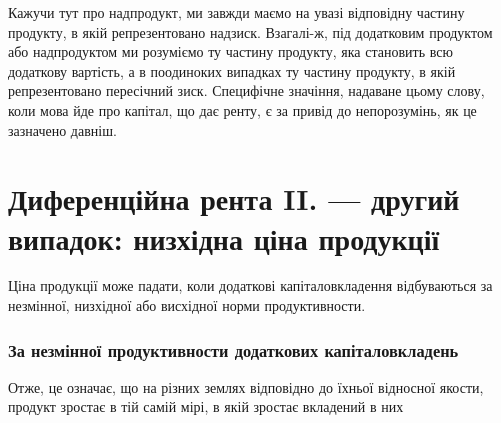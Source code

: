 Кажучи тут про надпродукт, ми завжди маємо на увазі відповідну
частину продукту, в якій репрезентовано надзиск. Взагалі-ж, під додатковим
продуктом або надпродуктом ми розуміємо ту частину продукту, яка становить
всю додаткову вартість, а в поодиноких випадках ту частину продукту, в якій
репрезентовано пересічний зиск. Специфічне значіння, надаване цьому слову,
коли мова йде про капітал, що дає ренту, є за привід до непорозумінь, як це
зазначено давніш.

\section{Диференційна рента II. — другий випадок: низхідна
ціна продукції}

Ціна продукції може падати, коли додаткові капіталовкладення відбуваються
за незмінної, низхідної або висхідної норми продуктивности.

\subsubsection{За незмінної продуктивности додаткових капіталовкладень}

Отже, це означає, що на різних землях відповідно до їхньої відносної
якости, продукт зростає в тій самій мірі, в якій зростає вкладений в них
\parbreak{}  %
